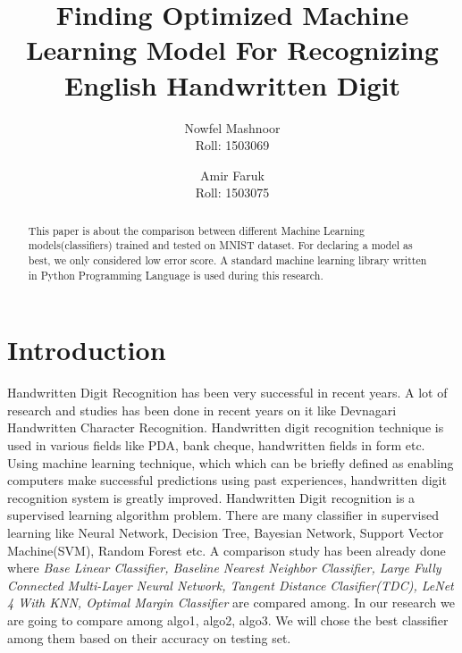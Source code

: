 \documentclass[12pt,a4paper]{article}
\title{Finding Optimized Machine Learning Model For Recognizing English Handwritten Digit}
\author{Nowfel Mashnoor\\Roll: 1503069\and Amir Faruk\\Roll: 1503075}
\begin{document}
\date{}
\maketitle

\begin{abstract}
This paper is about the comparison between different Machine Learning models(classifiers) trained and tested on MNIST dataset. For declaring a model as best, we only considered low error score. A standard machine learning library written in Python Programming Language is used during this research. 
\end{abstract}

\section{Introduction}

Handwritten Digit Recognition has been very successful in recent years. A lot of research and studies has been done in recent years on it like Devnagari Handwritten Character Recognition\cite{pal2009comparative}. Handwritten digit recognition technique is used in various fields like PDA, bank cheque, handwritten fields in form etc.\cite{plamondon2000online} Using machine learning technique, which which can be briefly defined as enabling computers make successful predictions using past experiences, \cite{bacstanlar2014introduction} handwritten digit recognition system is greatly improved. Handwritten Digit recognition is a supervised learning algorithm problem. There are many classifier in supervised learning like Neural Network, Decision Tree,  Bayesian Network, Support Vector Machine(SVM), Random Forest etc\cite{kotsiantis2007supervised}. A comparison study has been already done where \textit{Base Linear Classifier, Baseline Nearest Neighbor Classifier, Large Fully Connected Multi-Layer Neural Network, Tangent Distance Clasifier(TDC), LeNet 4 With KNN, Optimal Margin Classifier} are compared among.\cite{lecun1995learning} In our research we are going to compare among algo1, algo2, algo3. We will chose the best classifier among them based on their accuracy on testing set. 

 

\end{document}
